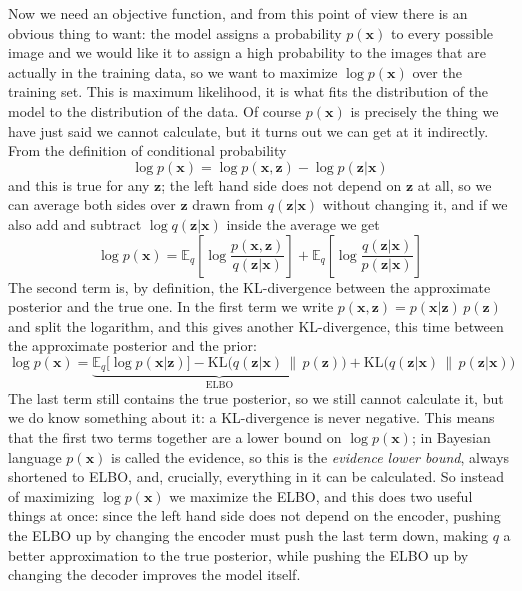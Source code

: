\documentclass[12pt]{article}
\begin{document}
Now we need an objective function, and from this point of view there
is an obvious thing to want: the model assigns a probability
$p(\mathbf{x})$ to every possible image and we would like it to assign
a high probability to the images that are actually in the training
data, so we want to maximize $\log p(\mathbf{x})$ over the training
set. This is maximum likelihood, it is what fits the distribution of
the model to the distribution of the data. Of course $p(\mathbf{x})$
is precisely the thing we have just said we cannot calculate, but it
turns out we can get at it indirectly. From the definition of
conditional probability
\begin{equation}
  \log p(\mathbf{x})=\log p(\mathbf{x},\mathbf{z})-\log p(\mathbf{z}|\mathbf{x})
\end{equation}
and this is true for any $\mathbf{z}$; the left hand side does not
depend on $\mathbf{z}$ at all, so we can average both sides over
$\mathbf{z}$ drawn from $q(\mathbf{z}|\mathbf{x})$ without changing
it, and if we also add and subtract $\log q(\mathbf{z}|\mathbf{x})$
inside the average we get
\begin{equation}
  \log p(\mathbf{x})
  =\mathbb{E}_q\left[\log\frac{p(\mathbf{x},\mathbf{z})}{q(\mathbf{z}|\mathbf{x})}\right]
  +\mathbb{E}_q\left[\log\frac{q(\mathbf{z}|\mathbf{x})}{p(\mathbf{z}|\mathbf{x})}\right]
\end{equation}
The second term is, by definition, the KL-divergence between the
approximate posterior and the true one. In the first term we write
$p(\mathbf{x},\mathbf{z})=p(\mathbf{x}|\mathbf{z})\,p(\mathbf{z})$ and
split the logarithm, and this gives another KL-divergence, this time
between the approximate posterior and the prior:
\begin{equation}
  \log p(\mathbf{x})=\underbrace{\mathbb{E}_{q}\big[\log p(\mathbf{x}|\mathbf{z})\big]-\mathrm{KL}\big(q(\mathbf{z}|\mathbf{x})\,\|\,p(\mathbf{z})\big)}_{\text{ELBO}}+\mathrm{KL}\big(q(\mathbf{z}|\mathbf{x})\,\|\,p(\mathbf{z}|\mathbf{x})\big)
\end{equation}
The last term still contains the true posterior, so we still cannot
calculate it, but we do know something about it: a KL-divergence is
never negative. This means that the first two terms together are a
lower bound on $\log p(\mathbf{x})$; in Bayesian language
$p(\mathbf{x})$ is called the evidence, so this is the
\textsl{evidence lower bound}, always shortened to ELBO, and,
crucially, everything in it can be calculated. So instead of
maximizing $\log p(\mathbf{x})$ we maximize the ELBO, and this does
two useful things at once: since the left hand side does not depend on
the encoder, pushing the ELBO up by changing the encoder must push the
last term down, making $q$ a better approximation to the true
posterior, while pushing the ELBO up by changing the decoder improves
the model itself.
\end{document}
